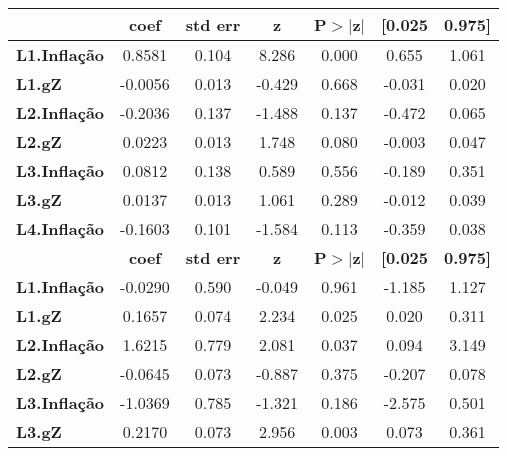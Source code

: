 \begin{center}
\begin{tabular}{lcccccc}
\toprule
                      & \textbf{coef} & \textbf{std err} & \textbf{z} & \textbf{P$> |$z$|$} & \textbf{[0.025} & \textbf{0.975]}  \\
\midrule
\textbf{L1.Inflação}  &       0.8581  &        0.104     &     8.286  &         0.000        &        0.655    &        1.061     \\
\textbf{L1.gZ}        &      -0.0056  &        0.013     &    -0.429  &         0.668        &       -0.031    &        0.020     \\
\textbf{L2.Inflação}  &      -0.2036  &        0.137     &    -1.488  &         0.137        &       -0.472    &        0.065     \\
\textbf{L2.gZ}        &       0.0223  &        0.013     &     1.748  &         0.080        &       -0.003    &        0.047     \\
\textbf{L3.Inflação}  &       0.0812  &        0.138     &     0.589  &         0.556        &       -0.189    &        0.351     \\
\textbf{L3.gZ}        &       0.0137  &        0.013     &     1.061  &         0.289        &       -0.012    &        0.039     \\
\textbf{L4.Inflação}  &      -0.1603  &        0.101     &    -1.584  &         0.113        &       -0.359    &        0.038     \\
                     & \textbf{coef} & \textbf{std err} & \textbf{z} & \textbf{P$> |$z$|$} & \textbf{[0.025} & \textbf{0.975]}  \\
\midrule
\textbf{L1.Inflação} &      -0.0290  &        0.590     &    -0.049  &         0.961        &       -1.185    &        1.127     \\
\textbf{L1.gZ}       &       0.1657  &        0.074     &     2.234  &         0.025        &        0.020    &        0.311     \\
\textbf{L2.Inflação} &       1.6215  &        0.779     &     2.081  &         0.037        &        0.094    &        3.149     \\
\textbf{L2.gZ}       &      -0.0645  &        0.073     &    -0.887  &         0.375        &       -0.207    &        0.078     \\
\textbf{L3.Inflação} &      -1.0369  &        0.785     &    -1.321  &         0.186        &       -2.575    &        0.501     \\
\textbf{L3.gZ}       &       0.2170  &        0.073     &     2.956  &         0.003        &        0.073    &        0.361     \\

\end{tabular}
\end{center}
